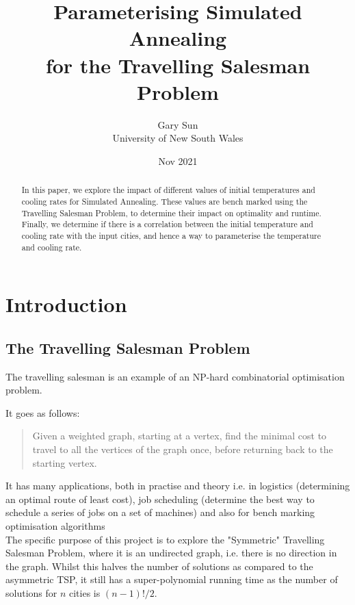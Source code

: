 \documentclass{article}
\title{
    Parameterising Simulated Annealing \\
    \large for the Travelling Salesman Problem
}
\author{
    Gary Sun \\
    \large University of New South Wales
}
\date{Nov 2021}
\begin{document}

\maketitle
\begin{abstract}
    \centering
    In this paper, we explore the impact of different values of initial temperatures and cooling rates for Simulated Annealing.
    These values are bench marked using the Travelling Salesman Problem, to determine their impact on optimality and runtime. 
    Finally, we determine if there is a correlation between the initial temperature and cooling rate with the input cities, and hence a way to parameterise the temperature and cooling rate.
\end{abstract}
\tableofcontents
\restoregeometry

\newpage
\section{Introduction}
\subsection{The Travelling Salesman Problem}
The travelling salesman is an example of an NP-hard combinatorial optimisation problem.

It goes as follows:
\begin{quote}
Given a weighted graph, starting at a vertex, find the minimal cost to travel to all the vertices of the graph once, before returning back to the starting vertex.
\end{quote}

It has many applications, both in practise and theory i.e. in logistics (determining an optimal route of least cost), job scheduling (determine the best way to schedule a series of jobs on a set of machines) and also for bench marking optimisation algorithms
\\

The specific purpose of this project is to explore the "Symmetric" Travelling Salesman Problem, where it is an undirected graph, i.e. there is no direction in the graph.
Whilst this halves the number of solutions as compared to the asymmetric TSP, it still has a super-polynomial running time as the number of solutions for $n$ cities is $(n - 1)! / 2$.
\end{document}
